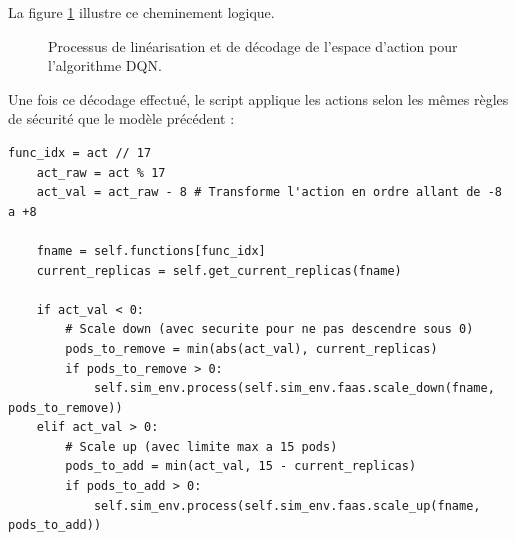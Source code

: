\documentclass[11pt,a4paper]{article}
\begin{document}
La figure \ref{fig:dqn_decoding} illustre ce cheminement logique.

\begin{figure}[htbp]
    \centering
    \caption{Processus de linéarisation et de décodage de l'espace d'action pour l'algorithme DQN.}
    \label{fig:dqn_decoding}
\end{figure}

Une fois ce décodage effectué, le script applique les actions selon les mêmes règles de sécurité que le modèle précédent :

\begin{lstlisting}[caption= Logique de scaling suite au décodage de l'action DQN, label=lst:scaling_dqn]
    func_idx = act // 17
    act_raw = act % 17
    act_val = act_raw - 8 # Transforme l'action en ordre allant de -8 a +8
    
    fname = self.functions[func_idx]
    current_replicas = self.get_current_replicas(fname)

    if act_val < 0:
        # Scale down (avec securite pour ne pas descendre sous 0)
        pods_to_remove = min(abs(act_val), current_replicas)
        if pods_to_remove > 0:
            self.sim_env.process(self.sim_env.faas.scale_down(fname, pods_to_remove))
    elif act_val > 0:
        # Scale up (avec limite max a 15 pods)
        pods_to_add = min(act_val, 15 - current_replicas)
        if pods_to_add > 0:
            self.sim_env.process(self.sim_env.faas.scale_up(fname, pods_to_add))
\end{lstlisting}
\end{document}
